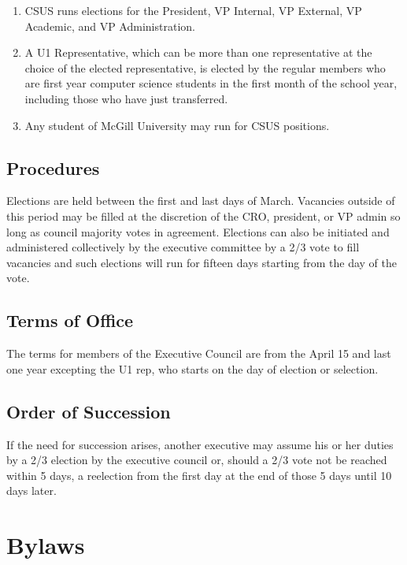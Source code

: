\begin{enumerate}
\def\labelenumi{\arabic{enumi}.}
\item
  CSUS runs elections for the President, VP Internal, VP External, VP
  Academic, and VP Administration.
\item
  A U1 Representative, which can be more than one representative at the
  choice of the elected representative, is elected by the regular
  members who are first year computer science students in the first
  month of the school year, including those who have just transferred.
\item
  Any student of McGill University may run for CSUS positions.
\end{enumerate}

\subsection{Procedures}\label{procedures}

Elections are held between the first and last days of March. Vacancies
outside of this period may be filled at the discretion of the CRO,
president, or VP admin so long as council majority votes in agreement.
Elections can also be initiated and administered collectively by the
executive committee by a 2/3 vote to fill vacancies and such elections
will run for fifteen days starting from the day of the vote.

\subsection{Terms of Office}\label{terms-of-office}

The terms for members of the Executive Council are from the April 15 and
last one year excepting the U1 rep, who starts on the day of election or
selection.

\subsection{Order of Succession}\label{order-of-succession}

If the need for succession arises, another executive may assume his or
her duties by a 2/3 election by the executive council or, should a 2/3
vote not be reached within 5 days, a reelection from the first day at
the end of those 5 days until 10 days later.

\section{Bylaws}\label{bylaws}

